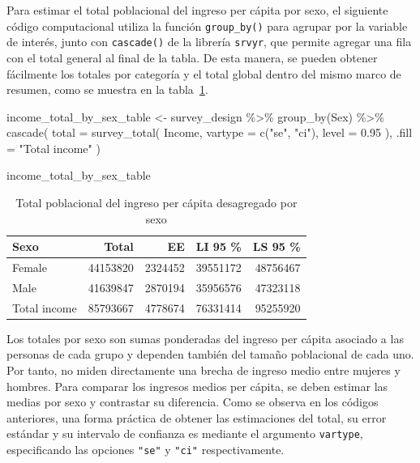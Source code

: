 \documentclass[
  spanish,
  11pt,
  letterpaper,
  oneside,
  open=any]{scrbook}
\newenvironment{Shaded}{\begin{snugshade}}{\end{snugshade}}
\newcommand{\AttributeTok}[1]{\textcolor[rgb]{0.40,0.45,0.13}{#1}}
\newcommand{\FloatTok}[1]{\textcolor[rgb]{0.68,0.00,0.00}{#1}}
\newcommand{\FunctionTok}[1]{\textcolor[rgb]{0.28,0.35,0.67}{#1}}
\newcommand{\NormalTok}[1]{\textcolor[rgb]{0.00,0.23,0.31}{#1}}
\newcommand{\OtherTok}[1]{\textcolor[rgb]{0.00,0.23,0.31}{#1}}
\newcommand{\SpecialCharTok}[1]{\textcolor[rgb]{0.37,0.37,0.37}{#1}}
\newcommand{\StringTok}[1]{\textcolor[rgb]{0.13,0.47,0.30}{#1}}
\begin{document}
Para estimar el total poblacional del ingreso per cápita por sexo, el
siguiente código computacional utiliza la función \texttt{group\_by()}
para agrupar por la variable de interés, junto con \texttt{cascade()} de
la librería \texttt{srvyr}, que permite agregar una fila con el total
general al final de la tabla. De esta manera, se pueden obtener
fácilmente los totales por categoría y el total global dentro del mismo
marco de resumen, como se muestra en la
tabla~\ref{tbl-total-ingreso-sexo}.

\begin{Shaded}
\begin{Highlighting}[]
\NormalTok{income\_total\_by\_sex\_table }\OtherTok{\textless{}{-}}\NormalTok{ survey\_design }\SpecialCharTok{\%\textgreater{}\%}
  \FunctionTok{group\_by}\NormalTok{(Sex) }\SpecialCharTok{\%\textgreater{}\%}
  \FunctionTok{cascade}\NormalTok{(}
    \AttributeTok{total =} \FunctionTok{survey\_total}\NormalTok{(}
\NormalTok{      Income,}
      \AttributeTok{vartype =} \FunctionTok{c}\NormalTok{(}\StringTok{"se"}\NormalTok{, }\StringTok{"ci"}\NormalTok{),}
      \AttributeTok{level =} \FloatTok{0.95}
\NormalTok{    ),}
    \AttributeTok{.fill =} \StringTok{"Total income"}
\NormalTok{  )}

\NormalTok{income\_total\_by\_sex\_table}
\end{Highlighting}
\end{Shaded}

{

\begin{longtable}[]{@{}lrrrr@{}}

\caption{\label{tbl-total-ingreso-sexo}Total poblacional del ingreso per
cápita desagregado por sexo}

\tabularnewline

\toprule\noalign{}
Sexo & Total & EE & LI 95 \% & LS 95 \% \\
\midrule\noalign{}
\endhead
\bottomrule\noalign{}
\endlastfoot
Female & 44153820 & 2324452 & 39551172 & 48756467 \\
Male & 41639847 & 2870194 & 35956576 & 47323118 \\
Total income & 85793667 & 4778674 & 76331414 & 95255920 \\

\end{longtable}

}

Los totales por sexo son sumas ponderadas del ingreso per cápita
asociado a las personas de cada grupo y dependen también del tamaño
poblacional de cada uno. Por tanto, no miden directamente una brecha de
ingreso medio entre mujeres y hombres. Para comparar los ingresos medios
per cápita, se deben estimar las medias por sexo y contrastar su
diferencia. Como se observa en los códigos anteriores, una forma
práctica de obtener las estimaciones del total, su error estándar y su
intervalo de confianza es mediante el argumento \texttt{vartype},
especificando las opciones \texttt{"se"} y \texttt{"ci"}
respectivamente.
\end{document}
